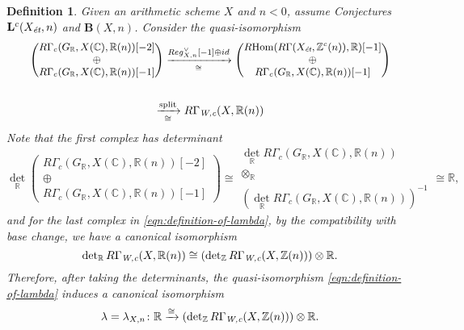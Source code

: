 \documentclass[10pt,a4paper,oneside]{article}
\DeclareMathOperator{\Hom}{Hom}
\newcommand{\CC}{\mathbb{C}}
\newcommand{\RR}{\mathbb{R}}
\newcommand{\ZZ}{\mathbb{Z}}
\renewcommand{\det}{\operatorname{det}}
\newcommand{\et}{\text{\it \'{e}t}}
\newcommand{\Wc}{\text{\it W,c}}
\newcommand{\RHom}{R\!\Hom}
\theoremstyle{myplain}
\theoremstyle{mydefinition}
\newtheorem{definition}[theorem]{Definition}
\numberwithin{equation}{section}
\begin{document}
\begin{definition}
  Given an arithmetic scheme $X$ and $n < 0$, assume
  Conjectures~$\mathbf{L}^c (X_\et, n)$ and $\mathbf{B} (X,n)$. Consider the
  quasi-isomorphism
  \begin{multline}\small
    \label{eqn:definition-of-lambda}
    \left(\!\!\!\begin{array}{c} R\Gamma_c (G_\RR, X (\CC), \RR (n)) [-2] \\ \oplus \\ R\Gamma_c (G_\RR, X (\CC), \RR (n)) [-1] \end{array}\!\!\!\right)
    \xrightarrow[\cong]{Reg_{X,n}^\vee [-1] \oplus id}
    \left(\!\!\!\begin{array}{c} \RHom (R\Gamma (X_\et, \ZZ^c (n)), \RR) [-1] \\ \oplus \\ R\Gamma_c (G_\RR, X (\CC), \RR (n)) [-1] \end{array}\!\!\!\right) \\
    \\
    \xrightarrow[\cong]{\text{split}} R\Gamma_\Wc (X, \RR (n))
  \end{multline}
  Note that the first complex has determinant
  \[ \det_\RR \left(\!\!\begin{array}{c} R\Gamma_c (G_\RR, X (\CC), \RR (n)) [-2] \\ \oplus \\ R\Gamma_c (G_\RR, X (\CC), \RR (n)) [-1] \end{array}\!\!\right) \cong
    \begin{array}{c} \det_\RR R\Gamma_c (G_\RR, X (\CC), \RR (n)) \\ \otimes_\RR \\ (\det_\RR R\Gamma_c (G_\RR, X (\CC), \RR (n)))^{-1} \end{array} \cong \RR, \]
  and for the last complex in \eqref{eqn:definition-of-lambda}, by the
  compatibility with base change, we have a canonical isomorphism
  \[ \det_\RR R\Gamma_\Wc (X, \RR (n)) \cong
    (\det_\ZZ R\Gamma_\Wc (X, \ZZ (n))) \otimes \RR. \]
  Therefore, after taking the determinants, the quasi-isomorphism
  \eqref{eqn:definition-of-lambda} induces a canonical isomorphism
  \begin{equation}
    \label{eqn:morphism-lambda}
    \lambda = \lambda_{X,n}\colon \RR \xrightarrow{\cong}
    (\det_\ZZ R\Gamma_\Wc (X, \ZZ (n))) \otimes \RR.
  \end{equation}
\end{definition}
\end{document}
